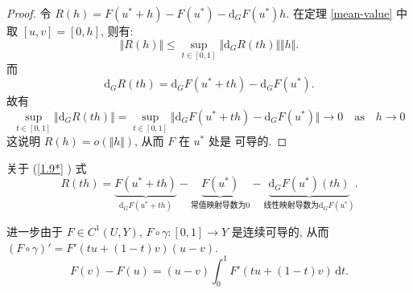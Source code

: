 \documentclass[11pt]{ctexart}
\begin{document}
\begin{proof}
  令 $R(h) = F(u^{*}+h) - F(u^{*}) - \mathrm{d}_{G}F(u^{*})h$. 在定理 \ref{mean-value} 中取 $[u,v]=[0,h]$, 则有:
  \begin{equation*}
    \Vert R(h) \Vert \leq \sup\limits_{t \in [0,1]} \Vert \mathrm{d}_{G} R(th) \Vert \Vert h \Vert.
  \end{equation*}
  而
  \begin{equation}\label{1.9*}
    \mathrm{d}_{G} R(th) = \mathrm{d}_{G} F(u^{*}+th) - \mathrm{d}_{G} F(u^{*}).
  \end{equation}
  故有
  \begin{equation*}
    \sup\limits_{t \in [0,1]} \Vert \mathrm{d}_{G} R(th) \Vert = \sup\limits_{t \in [0,1]} \Vert \mathrm{d}_{G} F(u^{*}+th) - \mathrm{d}_{G} F(u^{*}) \Vert \to 0 \quad \text{as}\quad  h \to 0
  \end{equation*}
  这说明 $R(h) = o(\Vert h \Vert)$, 从而 $F$ 在 $u^{*}$ 处是 \Frechet 可导的.
\end{proof}
\begin{remark}
  关于 (\ref{1.9*} ) 式
  \begin{equation*}
    R(th) = \underbrace{F(u^{*}+th)}_{\mathrm{d}_{G}F(u^{*}+th)} - \underbrace{F(u^{*})}_{\text{常值映射导数为}0} - \underbrace{\mathrm{d}_{G}F(u^{*}) (th)}_{\text{线性映射导数为}\mathrm{d}_{G}F(u^{*})}.
  \end{equation*}
\end{remark}
进一步由于 $F \in C^{1}(U,Y)$, $F \circ \gamma : [0,1] \to Y$ 是连续可导的, 从而 $(F \circ \gamma)' = F'(tu+(1-t)v)(u-v)$.
\begin{equation*}
  F(v)-F(u) = (u-v)\int_{0}^{1} F'(tu+(1-t)v) \, \mathrm{d}t.
\end{equation*}
\end{document}
